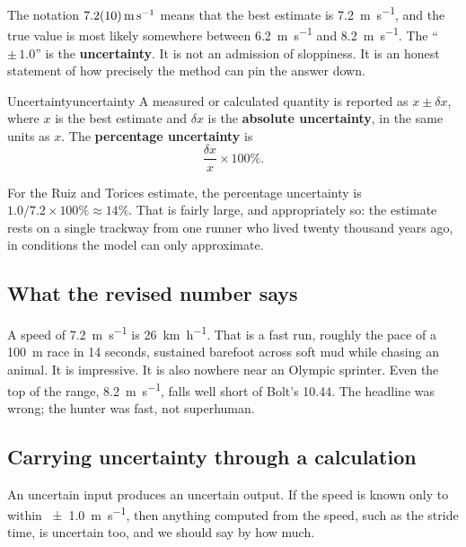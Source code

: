 \documentclass[11pt,twoside,openany]{book}
\begin{document}
The notation $\SI{7.2 \pm 1.0}{\metre\per\second}$ means that the best estimate is \SI{7.2}{\metre\per\second}, and the true value is most likely somewhere between \SI{6.2}{\metre\per\second} and \SI{8.2}{\metre\per\second}. The ``$\pm\,1.0$'' is the \textbf{uncertainty}. It is not an admission of sloppiness. It is an honest statement of how precisely the method can pin the answer down.

\begin{definition}{Uncertainty}{uncertainty}
A measured or calculated quantity is reported as $x \pm \delta x$, where $x$ is the best estimate and $\delta x$ is the \textbf{absolute uncertainty}, in the same units as $x$. The \textbf{percentage uncertainty} is
\[
\frac{\delta x}{x}\times 100\%.
\]
\end{definition}

For the Ruiz and Torices estimate, the percentage uncertainty is $1.0/7.2 \times 100\% \approx 14\%$. That is fairly large, and appropriately so: the estimate rests on a single trackway from one runner who lived twenty thousand years ago, in conditions the model can only approximate.

\subsection{What the revised number says}

A speed of \SI{7.2}{\metre\per\second} is \SI{26}{\kilo\metre\per\hour}. That is a fast run, roughly the pace of a \SI{100}{\metre} race in \num{14} seconds, sustained barefoot across soft mud while chasing an animal. It is impressive. It is also nowhere near an Olympic sprinter. Even the top of the range, \SI{8.2}{\metre\per\second}, falls well short of Bolt's \num{10.44}. The headline was wrong; the hunter was fast, not superhuman.

\subsection{Carrying uncertainty through a calculation}

An uncertain input produces an uncertain output. If the speed is known only to within \SI{\pm 1.0}{\metre\per\second}, then anything computed from the speed, such as the stride time, is uncertain too, and we should say by how much.
\end{document}
